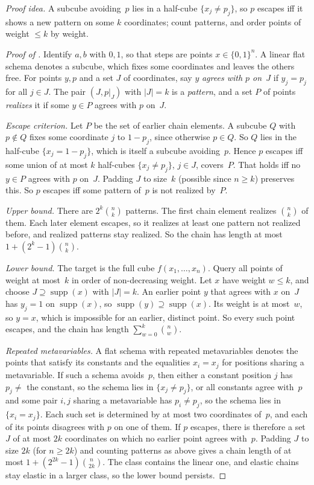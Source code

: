 \noindent\emph{Proof idea.} A subcube avoiding~$p$ lies in a half-cube $\{x_j\neq p_j\}$, so $p$ escapes iff it shows a new pattern on some $k$ coordinates; count patterns, and order points of weight $\le k$ by weight.

\begin{proof}[Proof of ]
Identify $a,b$ with $0,1$, so that steps are points $x\in\{0,1\}^n$. A linear flat schema denotes a subcube, which fixes some coordinates and leaves the others free. For points $y,p$ and a set $J$ of coordinates, say $y$ \emph{agrees with $p$ on~$J$} if $y_j=p_j$ for all $j\in J$. The pair $(J,p|_J)$ with $|J|=k$ is a \emph{pattern}, and a set $P$ of points \emph{realizes} it if some $y\in P$ agrees with $p$ on~$J$.

\emph{Escape criterion.} Let $P$ be the set of earlier chain elements. A subcube $Q$ with $p\notin Q$ fixes some coordinate $j$ to $1-p_j$, since otherwise $p\in Q$. So $Q$ lies in the half-cube $\{x_j=1-p_j\}$, which is itself a subcube avoiding~$p$. Hence $p$ escapes iff some union of at most $k$ half-cubes $\{x_j\neq p_j\}$, $j\in J$, covers~$P$. That holds iff no $y\in P$ agrees with $p$ on~$J$. Padding $J$ to size~$k$ (possible since $n\ge k$) preserves this. So $p$ escapes iff some pattern of~$p$ is not realized by~$P$.

\emph{Upper bound.} There are $2^k\binom nk$ patterns. The first chain element realizes $\binom nk$ of them. Each later element escapes, so it realizes at least one pattern not realized before, and realized patterns stay realized. So the chain has length at most $1+(2^k-1)\binom nk$.

\emph{Lower bound.} The target is the full cube $f(x_1,\dots,x_n)$. Query all points of weight at most~$k$ in order of non-decreasing weight. Let $x$ have weight $w\le k$, and choose $J\supseteq\operatorname{supp}(x)$ with $|J|=k$. An earlier point $y$ that agrees with $x$ on~$J$ has $y_j=1$ on $\operatorname{supp}(x)$, so $\operatorname{supp}(y)\supseteq\operatorname{supp}(x)$. Its weight is at most~$w$, so $y=x$, which is impossible for an earlier, distinct point. So every such point escapes, and the chain has length $\sum_{w=0}^k\binom nw$.

\emph{Repeated metavariables.} A flat schema with repeated metavariables denotes the points that satisfy its constants and the equalities $x_i=x_j$ for positions sharing a metavariable. If such a schema avoids~$p$, then either a constant position $j$ has $p_j\neq$ the constant, so the schema lies in $\{x_j\neq p_j\}$, or all constants agree with~$p$ and some pair $i,j$ sharing a metavariable has $p_i\neq p_j$, so the schema lies in $\{x_i=x_j\}$. Each such set is determined by at most two coordinates of~$p$, and each of its points disagrees with $p$ on one of them. If $p$ escapes, there is therefore a set $J$ of at most $2k$ coordinates on which no earlier point agrees with~$p$. Padding $J$ to size $2k$ (for $n\ge2k$) and counting patterns as above gives a chain length of at most $1+(2^{2k}-1)\binom n{2k}$. The class contains the linear one, and elastic chains stay elastic in a larger class, so the lower bound persists.
\end{proof}

